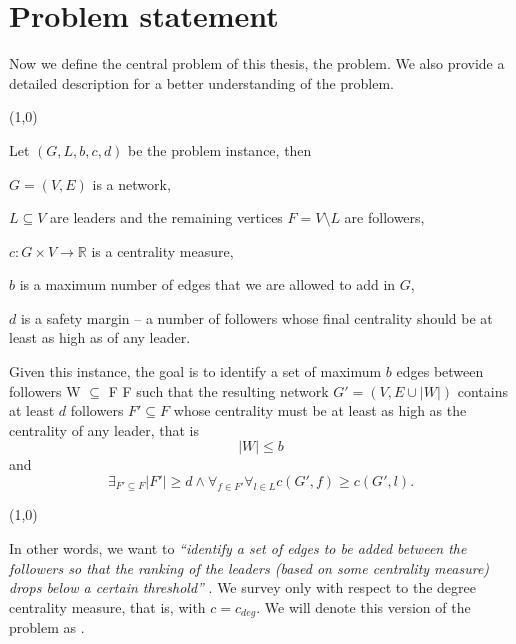 \chapter{Problem statement}\label{chapter:ProblemStatement}

Now we define the central problem of this thesis, the \HL problem.
We also provide a detailed description for a better understanding of the problem.

\begin{center}
    \line(1,0){\textwidth}
\end{center}
\begin{definition}\label{HL}
    Let $(G, L, b, c, d)$ be the problem instance, then
    \begin{description}
        \item $G = (V, E)$ is a network,
        \item $L \subseteq V$ are leaders and the remaining vertices $F = V \setminus L$ are followers,
        \item $c : G \times V \rightarrow \mathbb{R}$ is a centrality measure,
        \item $b$ is a maximum number of edges that we are allowed to add in $G$,
        \item $d$ is a safety margin -- a number of followers whose final centrality should be at least as high as of any leader.
    \end{description}
    Given this instance, the goal is to identify a set of maximum $b$ edges between followers W $\subseteq$ F {\texttimes} F
    such that the resulting network $G' = (V, E \cup |W|)$ contains at least $d$ followers $F' \subseteq F$
    whose centrality must be at least as high as the centrality of any leader, that is
    $$|W| \leq b$$
    and
    $$\exists_{F' \subseteq F} |F'| \geq d \wedge \forall_{f \in F'} \forall_{l \in L} c(G', f) \geq c(G', l).$$
\end{definition}
\begin{center}
    \line(1,0){\textwidth}
\end{center}

In other words, we want to \emph{``identify a set of edges to be added between the followers so that
the ranking of the leaders (based on some centrality measure) drops below a certain threshold''} \cite{Waniek2017}.
We survey \HLshort only with respect to the degree centrality measure, that is, with $c = c_{deg}$.
We will denote this version of the problem as \HLdeg.

